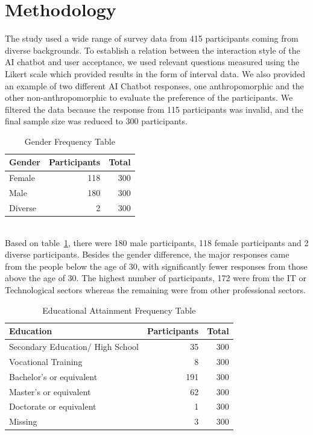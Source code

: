 \documentclass[conference]{IEEEtran}
\begin{document}
\section{Methodology}
The study used a wide range of survey data from 415 participants coming from diverse backgrounds. To establish a relation between the interaction style of the AI chatbot and user acceptance, we used relevant questions measured using the Likert scale which provided results in the form of interval data. We also provided an example of two different AI Chatbot responses, one anthropomorphic and the other non-anthropomorphic to evaluate the preference of the participants. We filtered the data because the response from 115 participants was invalid, and the final sample size was reduced to 300 participants.   
\begin{table}[ht]
    \centering
    \caption{Gender Frequency Table}
    \label{tab:genderTest}
    \begin{tabular}{lrr}
        \toprule
        \textbf{Gender} & \textbf{Participants} & \textbf{Total} \\
        \midrule
        Female & 118 & 300 \\
        Male & 180 & 300 \\
        Diverse & 2 & 300 \\
        \bottomrule
    \end{tabular}
\end{table}
\\

Based on table~\ref{tab:genderTest}, there were 180 male participants, 118 female participants and 2 diverse participants. Besides the gender difference, the major responses came from the people below the age of 30, with significantly fewer responses from those above the age of 30. The highest number of participants, 172 were from the IT or Technological sectors whereas the remaining were from other professional sectors.

\begin{table}[ht]
    \centering
    \caption{Educational Attainment Frequency Table}
    \label{tab:educationalTest}
    \begin{tabular}{lrr}
        \toprule
        \textbf{Education} & \textbf{Participants} & \textbf{Total} \\
        \midrule
        Secondary Education/ High School & 35 & 300 \\
		Vocational Training & 8 & 300 \\
        Bachelor's or equivalent & 191 & 300 \\
        Master's or equivalent & 62 & 300 \\
		Doctorate or equivalent & 1 & 300 \\
		Missing & 3 & 300 \\
        \bottomrule
    \end{tabular}
\end{table}
\end{document}
